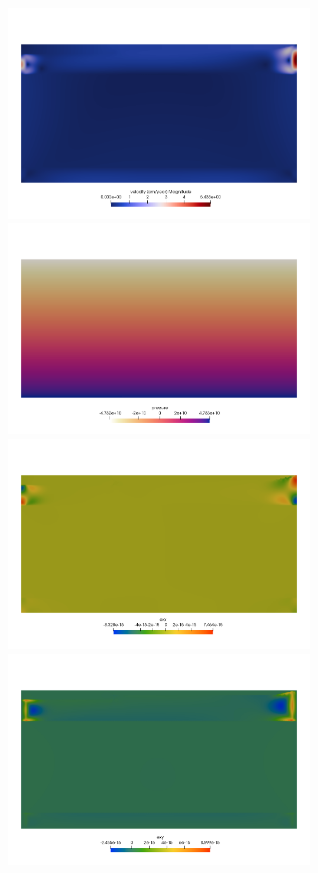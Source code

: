 \newpage

\begin{center}
\includegraphics[width=8cm]{python_codes/fieldstone_143/results/resolutions/vel}
\includegraphics[width=8cm]{python_codes/fieldstone_143/results/resolutions/press}\\
\includegraphics[width=8cm]{python_codes/fieldstone_143/results/resolutions/exx}
\includegraphics[width=8cm]{python_codes/fieldstone_143/results/resolutions/exy}\\

\end{center}
